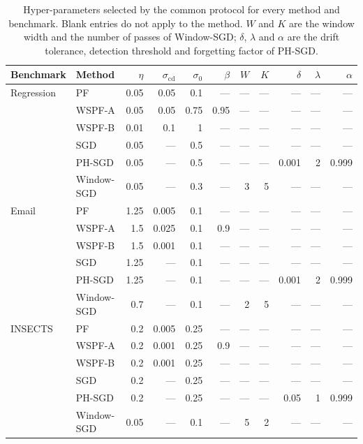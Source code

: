 \begin{table}[htbp]
\centering
\scriptsize
\setlength{\tabcolsep}{3pt}
\caption{Hyper-parameters selected by the common protocol for every method and benchmark. Blank entries do not apply to the method. $W$ and $K$ are the window width and the number of passes of Window-SGD; $\delta$, $\lambda$ and $\alpha$ are the drift tolerance, detection threshold and forgetting factor of PH-SGD.}
\label{tab:s1_selected_hp}
\begin{tabular}{@{}llrrrrrrrrr@{}}
\toprule
Benchmark & Method & $\eta$ & $\sigma_{\mathrm{cd}}$ & $\sigma_0$ & $\beta$ & $W$ & $K$ & $\delta$ & $\lambda$ & $\alpha$ \\
\midrule
Regression & PF & 0.05 & 0.05 & 0.1 & --- & --- & --- & --- & --- & --- \\
 & WSPF-A & 0.05 & 0.05 & 0.75 & 0.95 & --- & --- & --- & --- & --- \\
 & WSPF-B & 0.01 & 0.1 & 1 & --- & --- & --- & --- & --- & --- \\
 & SGD & 0.05 & --- & 0.5 & --- & --- & --- & --- & --- & --- \\
 & PH-SGD & 0.05 & --- & 0.5 & --- & --- & --- & 0.001 & 2 & 0.999 \\
 & Window-SGD & 0.05 & --- & 0.3 & --- & 3 & 5 & --- & --- & --- \\
\midrule
Email & PF & 1.25 & 0.005 & 0.1 & --- & --- & --- & --- & --- & --- \\
 & WSPF-A & 1.5 & 0.025 & 0.1 & 0.9 & --- & --- & --- & --- & --- \\
 & WSPF-B & 1.5 & 0.001 & 0.1 & --- & --- & --- & --- & --- & --- \\
 & SGD & 1.25 & --- & 0.1 & --- & --- & --- & --- & --- & --- \\
 & PH-SGD & 1.25 & --- & 0.1 & --- & --- & --- & 0.001 & 2 & 0.999 \\
 & Window-SGD & 0.7 & --- & 0.1 & --- & 2 & 5 & --- & --- & --- \\
\midrule
INSECTS & PF & 0.2 & 0.005 & 0.25 & --- & --- & --- & --- & --- & --- \\
 & WSPF-A & 0.2 & 0.001 & 0.25 & 0.9 & --- & --- & --- & --- & --- \\
 & WSPF-B & 0.2 & 0.001 & 0.25 & --- & --- & --- & --- & --- & --- \\
 & SGD & 0.2 & --- & 0.25 & --- & --- & --- & --- & --- & --- \\
 & PH-SGD & 0.2 & --- & 0.25 & --- & --- & --- & 0.05 & 1 & 0.999 \\
 & Window-SGD & 0.05 & --- & 0.1 & --- & 5 & 2 & --- & --- & --- \\
\bottomrule
\end{tabular}
\end{table}
